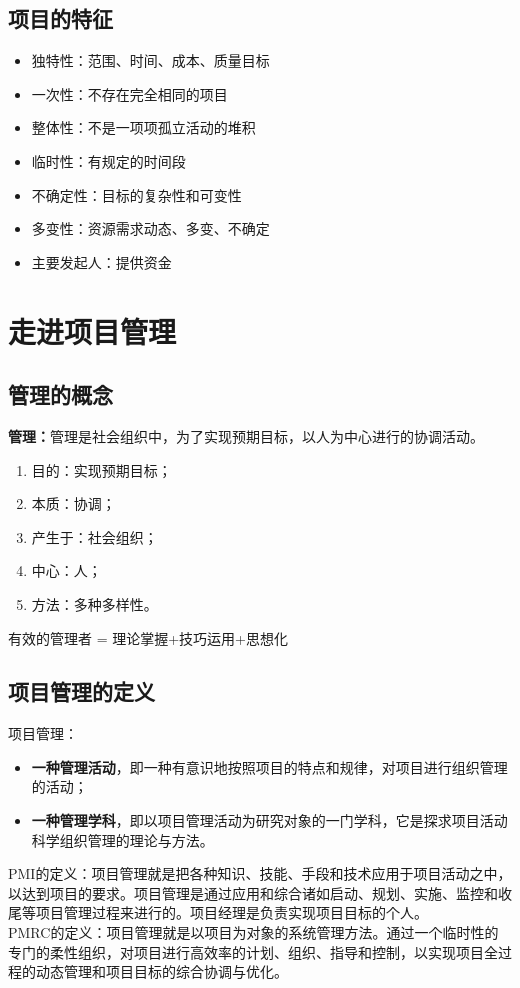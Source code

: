 \subsection{项目的特征}
\begin{itemize}
	\item 独特性：范围、时间、成本、质量目标
	\item 一次性：不存在完全相同的项目
	\item 整体性：不是一项项孤立活动的堆积
	\item 临时性：有规定的时间段
	\item 不确定性：目标的复杂性和可变性
	\item 多变性：资源需求动态、多变、不确定
	\item 主要发起人：提供资金
\end{itemize}
\section{走进项目管理}
\subsection{管理的概念}
\par \textbf{管理：}管理是社会组织中，为了实现预期目标，以人为中心进行的协调活动。
\begin{enumerate}
	\item 目的：实现预期目标；
	\item 本质：协调；
	\item 产生于：社会组织；
	\item 中心：人；
	\item 方法：多种多样性。
\end{enumerate}
有效的管理者 = 理论掌握+技巧运用+思想化
\subsection{项目管理的定义}
项目管理：
\begin{itemize}
	\item \textbf{一种管理活动}，即一种有意识地按照项目的特点和规律，对项目进行组织管理的活动；
	\item \textbf{一种管理学科}，即以项目管理活动为研究对象的一门学科，它是探求项目活动科学组织管理的理论与方法。
\end{itemize}
PMI的定义：项目管理就是把各种知识、技能、手段和技术应用于项目活动之中，以达到项目的要求。项目管理是通过应用和综合诸如启动、规划、实施、监控和收尾等项目管理过程来进行的。项目经理是负责实现项目目标的个人。\\
PMRC的定义：项目管理就是以项目为对象的系统管理方法。通过一个临时性的专门的柔性组织，对项目进行高效率的计划、组织、指导和控制，以实现项目全过程的动态管理和项目目标的综合协调与优化。
